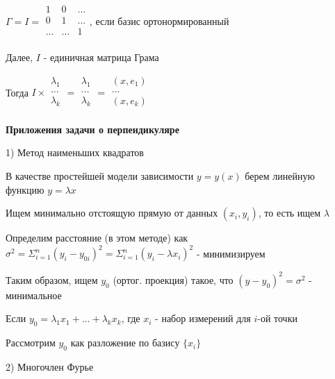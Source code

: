 \documentclass[12pt]{article}
\begin{document}
    $\Gamma = I = \begin{array}{|ccc|}
    1 & 0 & \ldots\\
    0 & 1 & \ldots\\
    \ldots & \ldots & 1\\
    \end{array}$, если базис ортонормированный

    Далее, $I$ - единичная матрица Грама

    \Nota Тогда $I \times \begin{array}{|c|}
    \lambda_1\\
    \ldots\\
    \lambda_k \\
    \end{array} = \begin{array}{|c|}
    \lambda_1\\
    \ldots\\
    \lambda_k \\
    \end{array} = \begin{array}{|c|}
    (x,e_1)\\
    \ldots\\
    (x,e_k) \\
    \end{array}$

    \vspace{5mm}

    \textbf{Приложения задачи о перпендикуляре}

    1) Метод наименьших квадратов

    В качестве простейшей модели зависимости $y = y(x)$ берем линейную функцию $y = \lambda x$

    Ищем минимально отстоящую прямую от данных $(x_i, y_i)$, то есть ищем $\lambda$

    Определим расстояние (в этом методе) как $\sigma^2 = \Sigma^n_{i=1} (y_i - y_{0i})^2 = \Sigma^n_{i=1} (y_i - \lambda x_i)^2$ - минимизируем

    Таким образом, ищем $y_0$ (ортог. проекция) такое, что $(y - y_0)^2 = \sigma^2$ - минимальное

    Если $y_0 = \lambda_1 x_1 + \dots + \lambda_k x_k$, где $x_i$ - набор измерений для $i$-ой точки

    Рассмотрим $y_0$ как разложение по базису $\{x_i\}$

    \vspace{5mm}

    2) Многочлен Фурье
\end{document}
